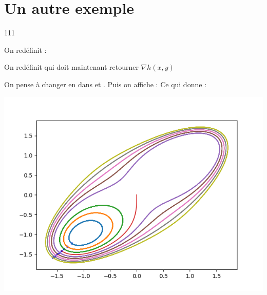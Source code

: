 \newpage
\section{Un autre exemple}
\begin{dinglist}{111}
  \item On redéfinit  :

  \item On redéfinit  qui doit maintenant retourner $\nabla h(x, y)$

  \item On pense à changer  en  dans  et .
  Puis on affiche :
  Ce qui donne :
  \begin{center}
    \includegraphics[scale=0.6]{section-08/qd.png}
  \end{center}

\end{dinglist}
